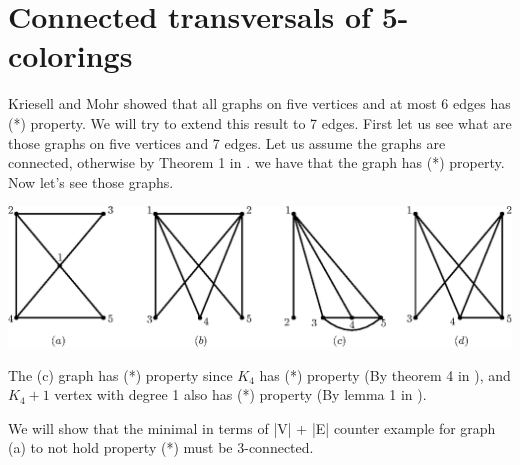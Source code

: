 \chapter{Connected transversals of 5-colorings}
Kriesell and Mohr \cite{matthias_2022} showed that all graphs on five vertices and at most 6 edges has (*) property. 
We will try to extend this result to 7 edges. First let us see what are those graphs on five vertices and 7 edges.
Let us assume the graphs are connected, otherwise by Theorem 1 in \cite{matthias_2022}. we have that the graph has (*) property.
Now let's see those graphs.

\vspace{0.1cm}
\includegraphics[width=13.5cm]{img/7-edge-cases.eps}

The (c) graph has (*) property since $K_4$ has (*) property (By theorem 4 in \cite{matthias_2022}), and $K_4 + 1$ vertex with degree 1 also has (*) property (By lemma 1 in \cite{matthias_2022}).

We will show that the minimal in terms of |V| + |E| counter example for graph (a) to not hold property (*) must be 3-connected.

